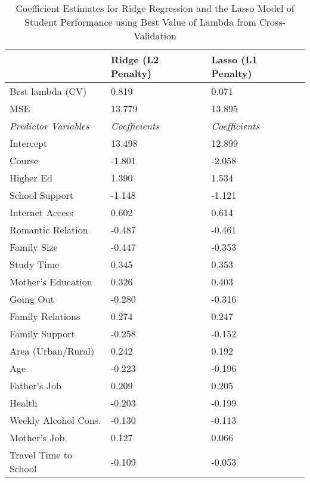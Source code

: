 \documentclass[sigconf]{acmart}
\begin{document}
\begin{table}
  \caption{Coefficient Estimates for Ridge Regression and the Lasso Model of 
  Student Performance using Best Value of Lambda from Cross-Validation}
  \label{tab:freq}
  \begin{tabular}{lll}
    \toprule    
                        &   Ridge (L2 Penalty)  & Lasso (L1 Penalty) \\
    \midrule
    Best lambda (CV)    &    0.819      &  0.071    \\
    MSE                 &   13.779      & 13.895    \\
    \midrule
    \textit{Predictor Variables}  & \textit{Coefficients} &  \textit{Coefficients} \\
    \midrule
    Intercept           &   13.498      &   12.899   \\
    Course              &   -1.801      &   -2.058   \\
    Higher Ed           &    1.390      &    1.534   \\
    School Support      &   -1.148      &   -1.121   \\
    Internet Access     &    0.602      &    0.614   \\
    Romantic Relation   &   -0.487      &   -0.461   \\    
    Family Size         &   -0.447      &   -0.353   \\   
    Study Time          &    0.345      &    0.353   \\   
    Mother's Education  &    0.326      &    0.403   \\    
    Going Out           &   -0.280      &   -0.316   \\
    Family Relations    &    0.274      &    0.247   \\
    Family Support      &   -0.258      &   -0.152   \\ 
    Area (Urban/Rural)  &    0.242      &    0.192   \\
    Age                 &   -0.223      &   -0.196   \\ 
    Father's Job        &    0.209      &    0.205   \\
    Health              &   -0.203      &   -0.199   \\
    Weekly Alcohol Cons.&   -0.130      &   -0.113   \\
    Mother's Job        &    0.127      &    0.066   \\
    Travel Time to School & -0.109      &   -0.053   \\

\end{tabular}
\end{table}
\end{document}
